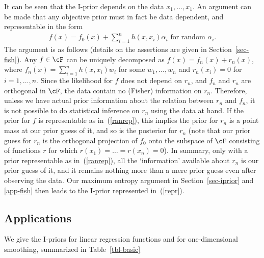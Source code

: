 \documentclass[preprint,12pt,authoryear]{elsarticle}
\begin{document}
It can be seen that the I-prior depends on the data $x_1,\ldots,x_1$. An argument can be made that any objective prior must in fact be data dependent, and representable in the form 
\begin{align}\label{ranrep}
f(x) = f_0(x) + \sum_{i=1}^n h(x,x_i)\alpha_i \mbox{ for random $\alpha_i$}.
\end{align}
The argument is as follows (details on the assertions are given in Section~\ref{sec-fish}). Any $f\in\cF$ can be uniquely decomposed as $f(x)=f_n(x)+r_n(x)$, where $f_n(x)=\sum_{i=1}^n h(x,x_i)w_i$ for some $w_1,\ldots,w_n$ and $r_n(x_i)=0$ for $i=1,\ldots,n$. Since the likelihood for $f$ does not depend on $r_n$, and $f_n$ and $r_n$ are orthogonal in $\cF$, the data contain no (Fisher) information on $r_n$. Therefore, unless we have actual prior information about the relation between $r_n$ and $f_n$, it is not possible to do statistical inference on $r_n$ using the data at hand. If the prior for $f$ is representable as in~(\ref{ranrep}), this implies the  prior for $r_n$ is a point mass at our prior guess of it, and so is the posterior for $r_n$ (note that our prior guess for $r_n$ is the orthogonal projection of $f_0$ onto the subspace of $\cF$ consisting of functions $r$ for which $r(x_1)=\ldots=r(x_n)=0$). 
In summary, only with a prior representable as in~(\ref{ranrep}), all the `information' available about $r_n$ is our prior guess of it, and it remains nothing more than a mere prior guess even after observing the data. Our maximum entropy argument in Section~\ref{sec-iprior} and \ref{app-fish} then leads to the I-prior represented in~(\ref{repr}).




\subsection{Applications}\label{sec-basic}

We give the I-priors for linear regression functions and for one-dimensional smoothing, summarized in Table~\ref{tbl-basic}
\end{document}
